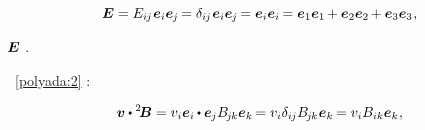 \nopagebreak\vspace{-0.2em}\begin{equation*}
\bm{E} =
E_{i\hspace{-0.1ex}j} \hspace{.16ex} \bm{e}_i \bm{e}_{\hspace{-0.1ex}j} \hspace{-0.2ex} =
\delta_{i\hspace{-0.1ex}j} \hspace{.16ex} \bm{e}_i \bm{e}_{\hspace{-0.1ex}j} \hspace{-0.2ex} =
\bm{e}_i \bm{e}_i \hspace{-0.2ex} =
\bm{e}_1 \bm{e}_1 \hspace{-0.2ex} + \bm{e}_2 \bm{e}_2 \hspace{-0.2ex} + \bm{e}_3 \bm{e}_3
\hspace{.1ex} ,
\end{equation*}

\vspace{-0.2em}\nopagebreak\noindent
{}
${\hspace{-0.15ex}\bm{E}}$
.

 ~\eqref{polyada:2}  
:

\nopagebreak\vspace{-0.2em}\begin{equation*}
\bm{v} \dotp \somebivalenttensor =
v_i\bm{e}_i
\hspace{-0.1ex} \dotp
\bm{e}_{\hspace{-0.1ex}j}
\somebivalenttensorcomponents{\hspace{-0.2ex}j\hspace{-0.1ex}k}
\bm{e}_k \hspace{-0.2ex}
= v_i
\delta_{i\hspace{-0.1ex}j}
\somebivalenttensorcomponents{\hspace{-0.2ex}j\hspace{-0.1ex}k} \hspace{.1ex}
\bm{e}_k \hspace{-0.2ex}
= v_i
\somebivalenttensorcomponents{ik}
\bm{e}_k
\hspace{.1ex} ,
\end{equation*}

